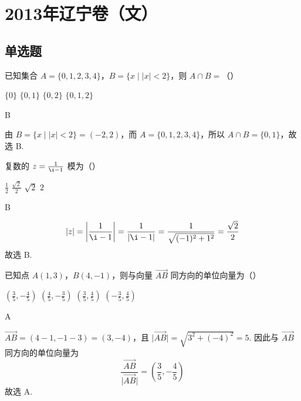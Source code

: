 \chapter{2013年辽宁卷（文）}

\section{单选题}

\begin{problem}
已知集合 \(A = \{0, 1, 2, 3, 4\}\)，\(B = \{x \mid |x| < 2\}\)，则 \(A \cap B =\)（\quad）

\choices
    {\( \{0\} \)}
    {\(\{0,1\}\)}
    {\(\{0,2\}\)}
    {\(\{0,1,2\}\)}
\end{problem}

\begin{answer}
B
\end{answer}

\begin{solution}
由 \(B=\{x\mid |x|<2\}=(-2,2)\)，而 \(A=\{0,1,2,3,4\}\)，所以
\(A\cap B=\{0,1\}\)，故选 B.
\end{solution}

\begin{problem}
复数的 \(z = \frac{1}{\i - 1}\) 模为（\quad）

\choices
    {\(\frac{1}{2}\)}
    {\(\frac{\sqrt{2}}{2}\)}
    {\(\sqrt{2}\)}
    {\(2\)}
\end{problem}

\begin{answer}
B
\end{answer}

\begin{solution}
\[
|z|=\left|\frac{1}{\i-1}\right|=\frac{1}{|\i-1|}
 =\frac{1}{\sqrt{(-1)^2+1^2}}=\frac{\sqrt{2}}{2}
\]
故选 B.
\end{solution}

\begin{problem}
已知点 \(A(1,3)\)，\(B(4,-1)\)，则与向量 \(\overrightarrow{AB}\) 同方向的单位向量为（\quad）

\choices
    {\(\left(\frac{3}{5}, -\frac{4}{5}\right)\)}
    {\( \left(\frac{4}{5},-\frac{3}{5}\right) \)}
    {\( \left(\frac{3}{5},\frac{4}{5}\right) \)}
    {\(\left(-\frac{3}{5}, \frac{4}{5}\right)\)}
\end{problem}

\begin{answer}
A
\end{answer}

\begin{solution}
\(\overrightarrow{AB}=(4-1,-1-3)=(3,-4)\)，且
\(\lvert\overrightarrow{AB}\rvert=\sqrt{3^2+(-4)^2}=5\). 因此与
\(\overrightarrow{AB}\) 同方向的单位向量为
\[
\frac{\overrightarrow{AB}}{\lvert\overrightarrow{AB}\rvert}
 =\left(\frac35,-\frac45\right)
\]
故选 A.
\end{solution}

